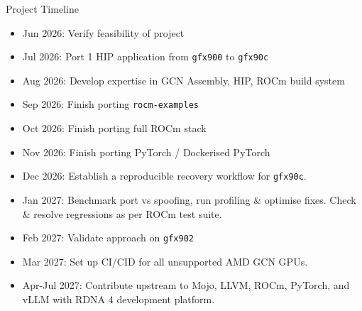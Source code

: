\documentclass[aspectratio=43,9pt]{beamer}
\begin{document}
\begin{frame}{Project Timeline}
\vspace{-0.5cm}
\begin{itemize}
        \item Jun 2026: Verify feasibility of project
        \item Jul 2026: Port 1 HIP application from \texttt{gfx900} to \texttt{gfx90c}
        \item Aug 2026: Develop expertise in GCN Assembly, HIP, ROCm build system
        \item Sep 2026: Finish porting \texttt{rocm-examples}
        \item Oct 2026: Finish porting full ROCm stack
        \item Nov 2026: Finish porting PyTorch / Dockerised PyTorch
        \item Dec 2026: Establish a reproducible recovery workflow for \texttt{gfx90c}.
        \item Jan 2027: Benchmark port vs spoofing, run profiling \& optimise fixes. Check \& resolve regressions as per ROCm test suite.
        \item Feb 2027: Validate approach on \texttt{gfx902}
        \item Mar 2027: Set up CI/CID for all unsupported AMD GCN GPUs.
        \item Apr-Jul 2027: Contribute upstream to Mojo, LLVM, ROCm, PyTorch, and vLLM with RDNA 4 development platform.
    \end{itemize}
\end{frame}
\end{document}
